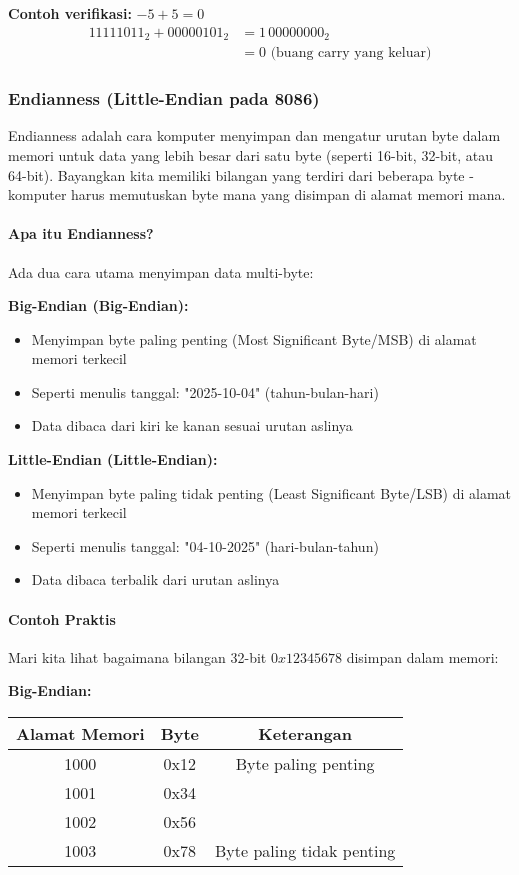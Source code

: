 \documentclass[../main.tex]{subfiles}
\begin{document}
\textbf{Contoh verifikasi:} \(-5 + 5 = 0\)
\begin{align}
11111011_2 + 00000101_2 &= 1\,00000000_2 \\
&= 0 \text{ (buang carry yang keluar)}
\end{align}

\subsubsection{Endianness (Little-Endian pada 8086)}

Endianness adalah cara komputer menyimpan dan mengatur urutan byte dalam memori untuk data yang lebih besar dari satu byte (seperti 16-bit, 32-bit, atau 64-bit). Bayangkan kita memiliki bilangan yang terdiri dari beberapa byte - komputer harus memutuskan byte mana yang disimpan di alamat memori mana.

\paragraph{Apa itu Endianness?}
Ada dua cara utama menyimpan data multi-byte:

\textbf{Big-Endian (Big-Endian):}
\begin{itemize}
    \item Menyimpan byte paling penting (Most Significant Byte/MSB) di alamat memori terkecil
    \item Seperti menulis tanggal: "2025-10-04" (tahun-bulan-hari)
    \item Data dibaca dari kiri ke kanan sesuai urutan aslinya
\end{itemize}

\textbf{Little-Endian (Little-Endian):}
\begin{itemize}
    \item Menyimpan byte paling tidak penting (Least Significant Byte/LSB) di alamat memori terkecil
    \item Seperti menulis tanggal: "04-10-2025" (hari-bulan-tahun)
    \item Data dibaca terbalik dari urutan aslinya
\end{itemize}

\paragraph{Contoh Praktis}
Mari kita lihat bagaimana bilangan 32-bit \(0x12345678\) disimpan dalam memori:

\textbf{Big-Endian:}
\begin{center}
\begin{tabular}{|c|c|c|}
\hline
\textbf{Alamat Memori} & \textbf{Byte} & \textbf{Keterangan} \\
\hline
1000 & 0x12 & Byte paling penting \\
1001 & 0x34 & \\
1002 & 0x56 & \\
1003 & 0x78 & Byte paling tidak penting \\
\hline
\end{tabular}
\end{center}
\end{document}
